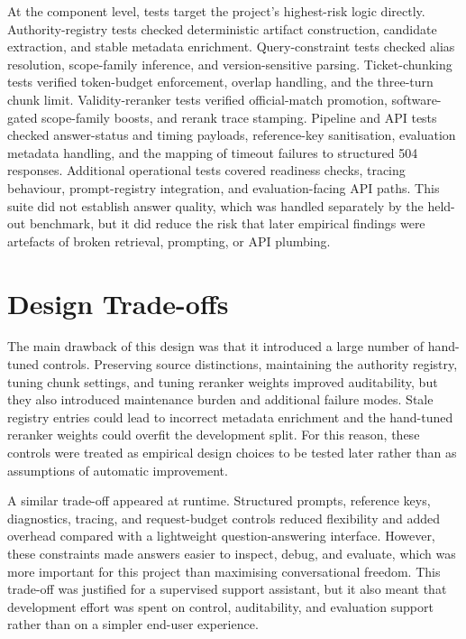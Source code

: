 At the component level, tests target the project's highest-risk logic directly. Authority-registry tests checked deterministic artifact construction, candidate extraction, and stable metadata enrichment. Query-constraint tests checked alias resolution, scope-family inference, and version-sensitive parsing. Ticket-chunking tests verified token-budget enforcement, overlap handling, and the three-turn chunk limit. Validity-reranker tests verified official-match promotion, software-gated scope-family boosts, and rerank trace stamping. Pipeline and API tests checked answer-status and timing payloads, reference-key sanitisation, evaluation metadata handling, and the mapping of timeout failures to structured 504 responses. Additional operational tests covered readiness checks, tracing behaviour, prompt-registry integration, and evaluation-facing API paths. This suite did not establish answer quality, which was handled separately by the held-out benchmark, but it did reduce the risk that later empirical findings were artefacts of broken retrieval, prompting, or API plumbing. 

\section{Design Trade-offs}

The main drawback of this design was that it introduced a large number of hand-tuned controls. Preserving source distinctions, maintaining the authority registry, tuning chunk settings, and tuning reranker weights improved auditability, but they also introduced maintenance burden and additional failure modes. Stale registry entries could lead to incorrect metadata enrichment and the hand-tuned reranker weights could overfit the development split. For this reason, these controls were treated as empirical design choices to be tested later rather than as assumptions of automatic improvement. 

A similar trade-off appeared at runtime. Structured prompts, reference keys, diagnostics, tracing, and request-budget controls reduced flexibility and added overhead compared with a lightweight question-answering interface. However, these constraints made answers easier to inspect, debug, and evaluate, which was more important for this project than maximising conversational freedom. This trade-off was justified for a supervised support assistant, but it also meant that development effort was spent on control, auditability, and evaluation support rather than on a simpler end-user experience. 